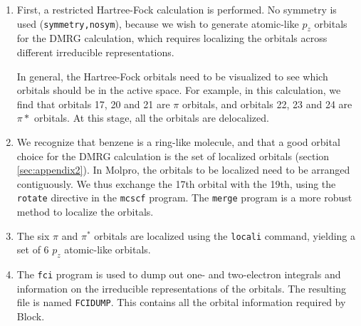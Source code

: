 \documentclass[letterpaper,12pt,aps, pra]{revtex4-1}
\begin{document}
\begin{enumerate}
 \item First, a restricted Hartree-Fock calculation is performed. No symmetry is 
used (\texttt{symmetry,nosym}), because we wish to generate atomic-like $p_z$ orbitals
for the DMRG calculation, which requires localizing the orbitals across different irreducible representations. 

In general, the Hartree-Fock orbitals need to be visualized to see which orbitals should be in the active space. For example, in this calculation, 
we find that orbitals 17, 20 and 21 are $\pi$ orbitals, and orbitals 22, 23 and 24 are $\pi*$ orbitals. 
At this stage, all the orbitals are delocalized.

\item We recognize that benzene is a ring-like molecule, and that a good
	orbital choice for the DMRG calculation is the set of localized
	orbitals (section \ref{sec:appendix2}). In Molpro, the orbitals to be
	localized need to be arranged contiguously. We thus exchange the 17th
	orbital with the 19th, using the \texttt{rotate} directive in the
	\texttt{mcscf} program. The \texttt{merge} program is a more robust
	method to localize the orbitals.


\item The six $\pi$ and $\pi^*$ orbitals are localized using the
	\texttt{locali} command, yielding a set of 6 $p_z$ atomic-like
	orbitals. 

\item The \texttt{fci} program is used to dump out one- and two-electron
integrals and information on the irreducible representations of the orbitals.
The resulting file is named \texttt{FCIDUMP}. This contains all the orbital
information required by Block.  \end{enumerate}
\end{document}
